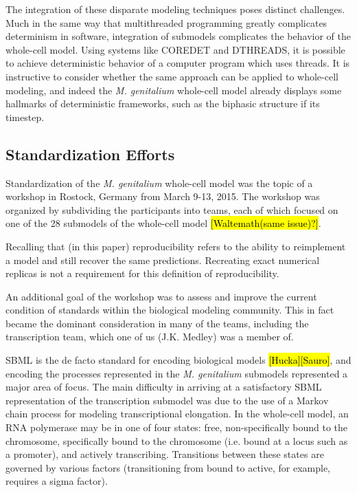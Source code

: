 \documentclass[journal,transmag]{IEEEtran}
\begin{document}
The integration of these disparate modeling techniques poses distinct challenges.
Much in the same way that multithreaded programming greatly complicates
determinism in software, integration of submodels complicates the behavior
of the whole-cell model.
Using systems like C{\small ORE}D{\small ET} and D{\small THREADS}, it is possible
to achieve deterministic behavior of a computer program which uses threads.
It is instructive to consider whether the same approach can be applied to whole-cell
modeling, and indeed the \textit{M. genitalium} whole-cell model already displays
some hallmarks of deterministic frameworks, such as the biphasic structure if its timestep.

\subsection{Standardization Efforts}

Standardization of the \textit{M. genitalium} whole-cell model \cite{Karr2012}
was the topic of a workshop in Rostock, Germany from March 9-13, 2015.
The workshop was organized by subdividing the participants into teams,
each of which focused on one of the 28 submodels of the whole-cell model
\hl{[Waltemath(same issue)?]}.

Recalling that (in this paper) reproducibility refers to the ability to
reimplement a model and still recover the same predictions.
Recreating exact numerical replicas is not a requirement for this definition
of reproducibility.

An additional goal of the workshop was to assess and improve the current
condition of standards within the biological modeling community.
This in fact became the dominant consideration in many of the teams,
including the transcription team, which one of us (J.K. Medley)
was a member of.

SBML is the de facto standard for encoding biological models \hl{[Hucka][Sauro]},
and encoding the processes represented in the \textit{M. genitalium}
submodels represented a major area of focus.
The main difficulty in arriving at a satisfactory SBML representation
of the transcription submodel was due to the use of a Markov chain
process for modeling transcriptional elongation.
In the whole-cell model, an RNA polymerase may be in one of four states:
free, non-specifically bound to the chromosome, specifically bound to
the chromosome (i.e. bound at a locus such as a promoter), and actively transcribing.
Transitions between these states are governed by various factors
(transitioning from bound to active, for example, requires a sigma factor).
\end{document}
